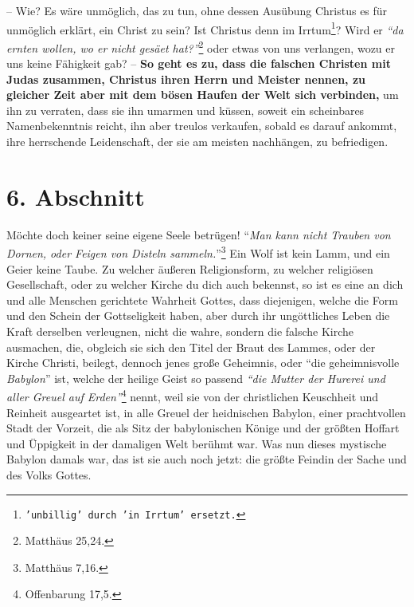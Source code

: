 -- Wie? Es wäre unmöglich, das zu tun, ohne dessen Ausübung Christus es für
unmöglich erklärt, ein Christ zu sein? Ist Christus denn im Irrtum\footnote{\texttt{'unbillig' durch 'in Irrtum' ersetzt.}}? Wird er
\textit{"`da ernten wollen, wo er nicht gesäet hat?"'}\footnote{Matthäus 25,24.}
oder etwas von uns verlangen, wozu er uns
keine Fähigkeit gab?
 \label{ref:01_05_in_suende_verbinden}
-- \textbf{So geht es zu, dass die falschen Christen mit Judas zusammen, Christus ihren
Herrn und Meister nennen, zu gleicher Zeit aber mit dem bösen Haufen der Welt
sich verbinden,} um ihn zu verraten,
dass sie ihn umarmen und küssen, soweit ein scheinbares Namenbekenntnis
 reicht, ihn aber treulos verkaufen, sobald es darauf
ankommt, ihre herrschende Leidenschaft, der sie am meisten nachhängen, zu
befriedigen.

\section{6. Abschnitt} \label{kap1_ab6}

Möchte doch keiner seine eigene Seele betrügen!
"`\textit{Man kann nicht Trauben von Dornen, oder Feigen von Disteln sammeln.}"'\footnote{Matthäus 7,16.} 
Ein Wolf ist kein Lamm, und ein Geier keine Taube.
Zu welcher äußeren Religionsform, zu welcher religiösen Gesellschaft, oder zu
welcher Kirche du dich auch bekennst, so ist es eine an dich und alle Menschen
gerichtete Wahrheit Gottes, dass diejenigen, welche die Form und den Schein der
Gottseligkeit haben, aber durch ihr ungöttliches Leben die Kraft derselben
verleugnen, nicht die wahre, sondern die falsche Kirche ausmachen, die, obgleich
sie sich den Titel der Braut des Lammes, oder der Kirche Christi, beilegt,
dennoch jenes große Geheimnis, oder "`die geheimnisvolle \textit{Babylon}"'
  ist, welche der heilige
Geist so passend
\textit{"`die Mutter der Hurerei und aller Greuel auf Erden"'}\footnote{Offenbarung 17,5.}
nennt, weil
sie von der christlichen Keuschheit und Reinheit ausgeartet ist, in alle Greuel
der heidnischen Babylon, einer prachtvollen Stadt der Vorzeit, die als Sitz der
babylonischen Könige und der größten Hoffart und Üppigkeit in der damaligen
Welt berühmt war. Was nun dieses mystische Babylon damals war, das ist sie auch
noch jetzt: die größte Feindin der Sache und des Volks Gottes.

